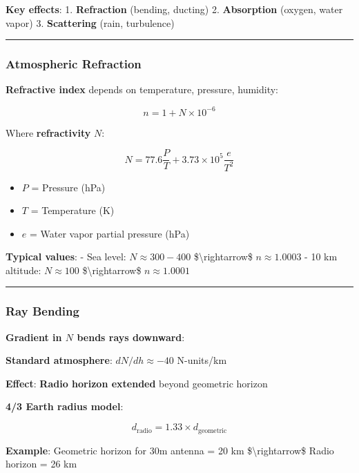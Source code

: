 \textbf{Key effects}: 1. \textbf{Refraction} (bending, ducting) 2.
\textbf{Absorption} (oxygen, water vapor) 3. \textbf{Scattering} (rain,
turbulence)

\begin{center}\rule{0.5\linewidth}{0.5pt}\end{center}

\subsubsection{Atmospheric Refraction}\label{atmospheric-refraction}

\textbf{Refractive index} depends on temperature, pressure, humidity:

\[
n = 1 + N \times 10^{-6}
\]

Where \textbf{refractivity} \(N\):

\[
N = 77.6 \frac{P}{T} + 3.73 \times 10^5 \frac{e}{T^2}
\]

\begin{itemize}
\tightlist
\item
  \(P\) = Pressure (hPa)
\item
  \(T\) = Temperature (K)
\item
  \(e\) = Water vapor partial pressure (hPa)
\end{itemize}

\textbf{Typical values}: - Sea level: \(N \approx 300-400\)
\$\textbackslash rightarrow\$ \(n \approx 1.0003\) - 10 km altitude:
\(N \approx 100\) \$\textbackslash rightarrow\$ \(n \approx 1.0001\)

\begin{center}\rule{0.5\linewidth}{0.5pt}\end{center}

\subsubsection{Ray Bending}\label{ray-bending}

\textbf{Gradient in \(N\) bends rays downward}:

\textbf{Standard atmosphere}: \(dN/dh \approx -40\) N-units/km

\textbf{Effect}: \textbf{Radio horizon extended} beyond geometric
horizon

\textbf{4/3 Earth radius model}:

\[
d_{\text{radio}} = 1.33 \times d_{\text{geometric}}
\]

\textbf{Example}: Geometric horizon for 30m antenna = 20 km
\$\textbackslash rightarrow\$ Radio horizon = 26 km

